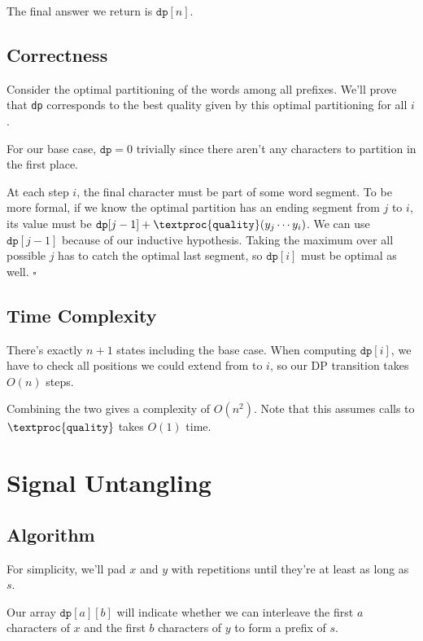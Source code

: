 \documentclass[12pt]{article}
\begin{document}
The final answer we return is $\texttt{dp}[n]$.

\subsection{Correctness}

Consider the optimal partitioning of the words among all prefixes.
We'll prove that \texttt{dp} corresponds to the best quality
given by this optimal partitioning for all $i$.

For our base case, $\texttt{dp}=0$ trivially
since there aren't any characters to partition in the first place.

At each step $i$, the final character must be part of some word segment.
To be more formal, if we know the optimal partition
has an ending segment from $j$ to $i$, its value must be
$\texttt{dp}[j-1]+\textproc{\texttt{quality}}(y_j \cdots y_i)$.
We can use $\texttt{dp}[j-1]$ because of our inductive hypothesis.
Taking the maximum over all possible $j$ has to catch the optimal last segment,
so $\texttt{dp}[i]$ must be optimal as well. $\square$

\subsection{Time Complexity}

There's exactly $n+1$ states including the base case.
When computing $\texttt{dp}[i]$, we have to check all positions
we could extend from to $i$, so our DP transition takes $O(n)$ steps.

Combining the two gives a complexity of $\boxed{O(n^2)}$.
Note that this assumes calls to $\textproc{\texttt{quality}}$ takes $O(1)$ time.

\pagebreak

\section{Signal Untangling}

\subsection{Algorithm}

For simplicity, we'll pad $x$ and $y$ with repetitions
until they're at least as long as $s$.

Our array $\texttt{dp}[a][b]$ will indicate whether
we can interleave the first $a$ characters of $x$ and the first $b$ characters
of $y$ to form a prefix of $s$.
\end{document}

